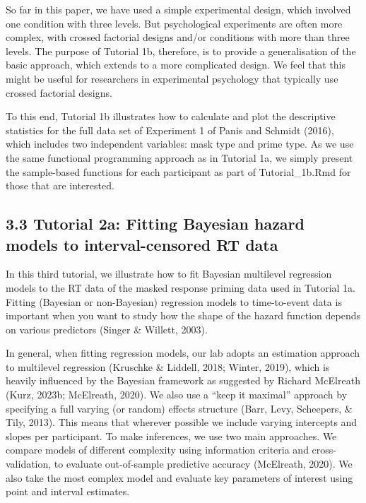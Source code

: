 \documentclass[
  man, donotrepeattitle,floatsintext]{apa6}
\begin{document}
So far in this paper, we have used a simple experimental design, which involved one condition with three levels. But psychological experiments are often more complex, with crossed factorial designs and/or conditions with more than three levels. The purpose of Tutorial 1b, therefore, is to provide a generalisation of the basic approach, which extends to a more complicated design. We feel that this might be useful for researchers in experimental psychology that typically use crossed factorial designs.

To this end, Tutorial 1b illustrates how to calculate and plot the descriptive statistics for the full data set of Experiment 1 of Panis and Schmidt (2016), which includes two independent variables: mask type and prime type. As we use the same functional programming approach as in Tutorial 1a, we simply present the sample-based functions for each participant as part of Tutorial\_1b.Rmd for those that are interested.

\subsection{3.3 Tutorial 2a: Fitting Bayesian hazard models to interval-censored RT data}\label{tutorial-2a-fitting-bayesian-hazard-models-to-interval-censored-rt-data}

In this third tutorial, we illustrate how to fit Bayesian multilevel regression models to the RT data of the masked response priming data used in Tutorial 1a. Fitting (Bayesian or non-Bayesian) regression models to time-to-event data is important when you want to study how the shape of the hazard function depends on various predictors (Singer \& Willett, 2003).

In general, when fitting regression models, our lab adopts an estimation approach to multilevel regression (Kruschke \& Liddell, 2018; Winter, 2019), which is heavily influenced by the Bayesian framework as suggested by Richard McElreath (Kurz, 2023b; McElreath, 2020). We also use a ``keep it maximal'' approach by specifying a full varying (or random) effects structure (Barr, Levy, Scheepers, \& Tily, 2013). This means that wherever possible we include varying intercepts and slopes per participant.
To make inferences, we use two main approaches. We compare models of different complexity using information criteria and cross-validation, to evaluate out-of-sample predictive accuracy (McElreath, 2020). We also take the most complex model and evaluate key parameters of interest using point and interval estimates.
\end{document}
